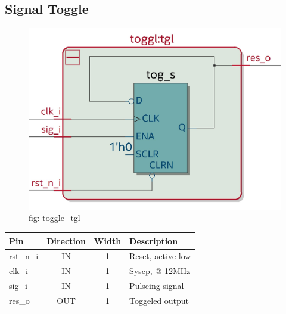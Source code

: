 \documentclass[12pt,a4 paper] {report}
\begin{document}
\newpage

\subsection{Signal Toggle}
\begin{figure}[h]
	\centering	
	\includegraphics[scale=0.2]{../png/toggl_tgl.png}
	\newline
	fig: toggle\_tgl \\
\end{figure}
\begin{center}
	\begin{tabular}{ | p{2cm} | c | c | p{5cm} |}
		\hline
		\textbf{Pin} & \textbf{Direction} & \textbf{Width} & \textbf{Description} \\
		\hline	
	  rst\_n\_i & IN & 1 & Reset, active low \\
	  \hline
		clk\_i & IN & 1 & Syscp, @ 12MHz \\
		\hline
		sig\_i & IN & 1 & Pulseing signal \\
		\hline
		res\_o & OUT & 1 & Toggeled output \\
		\hline
	\end{tabular}
\end{center}
\newpage
\end{document}
